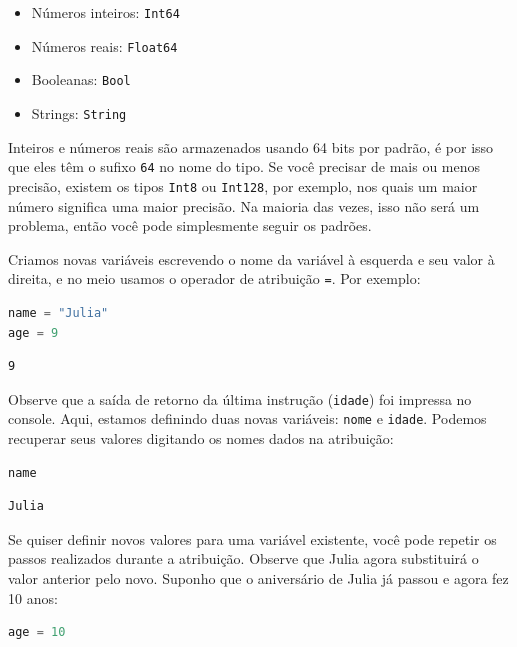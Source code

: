 \documentclass[
  notoc %
]{tufte-book}
\providecommand{\tightlist}{%
  \setlength{\itemsep}{0pt}\setlength{\parskip}{0pt}
}
\newcommand{\passthrough}[1]{#1}
\begin{document}
\begin{itemize}
\tightlist
\item
  Números inteiros: \passthrough{\lstinline!Int64!}
\item
  Números reais: \passthrough{\lstinline!Float64!}
\item
  Booleanas: \passthrough{\lstinline!Bool!}
\item
  Strings: \passthrough{\lstinline!String!}
\end{itemize}

Inteiros e números reais são armazenados usando 64 bits por padrão, é
por isso que eles têm o sufixo \passthrough{\lstinline!64!} no nome do
tipo. Se você precisar de mais ou menos precisão, existem os tipos
\passthrough{\lstinline!Int8!} ou \passthrough{\lstinline!Int128!}, por
exemplo, nos quais um maior número significa uma maior precisão. Na
maioria das vezes, isso não será um problema, então você pode
simplesmente seguir os padrões.

Criamos novas variáveis escrevendo o nome da variável à esquerda e seu
valor à direita, e no meio usamos o operador de atribuição
\passthrough{\lstinline!=!}. Por exemplo:

\begin{lstlisting}[language=Julia]
name = "Julia"
age = 9
\end{lstlisting}

\begin{lstlisting}[language=Output]
9
\end{lstlisting}

Observe que a saída de retorno da última instrução
(\passthrough{\lstinline!idade!}) foi impressa no console. Aqui, estamos
definindo duas novas variáveis: \passthrough{\lstinline!nome!} e
\passthrough{\lstinline!idade!}. Podemos recuperar seus valores
digitando os nomes dados na atribuição:

\begin{lstlisting}[language=Julia]
name
\end{lstlisting}

\begin{lstlisting}[language=Output]
Julia
\end{lstlisting}

Se quiser definir novos valores para uma variável existente, você pode
repetir os passos realizados durante a atribuição. Observe que Julia
agora substituirá o valor anterior pelo novo. Suponho que o aniversário
de Julia já passou e agora fez 10 anos:

\begin{lstlisting}[language=Julia]
age = 10
\end{lstlisting}
\end{document}
